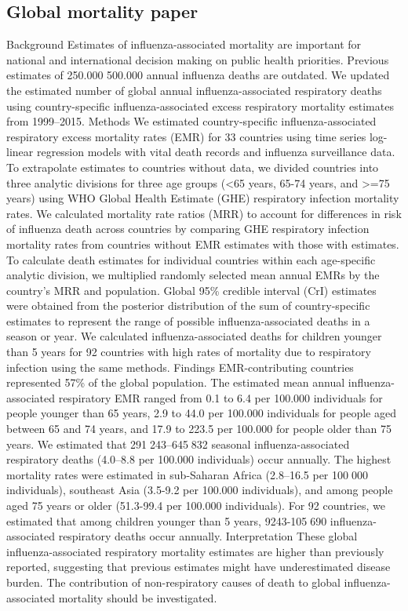 \subsection{Global mortality paper}
\cite{iulianoEstimatesGlobalSeasonal2018}
Background
Estimates of influenza-associated mortality are important for national and
international decision making on public health priorities. Previous estimates
of 250.000 500.000 annual influenza deaths are outdated. We updated the
estimated number of global annual influenza-associated respiratory deaths using
country-specific influenza-associated excess respiratory mortality estimates
from 1999–2015.
Methods
We estimated country-specific influenza-associated respiratory excess mortality
rates (EMR) for 33 countries using time series log-linear regression models
with vital death records and influenza surveillance data. To extrapolate
estimates to countries without data, we divided countries into three analytic
divisions for three age groups (<65 years, 65-74 years, and >=75 years) using
WHO Global Health Estimate (GHE) respiratory infection mortality rates. We
calculated mortality rate ratios (MRR) to account for differences in risk of
influenza death across countries by comparing GHE respiratory infection
mortality rates from countries without EMR estimates with those with estimates.
To calculate death estimates for individual countries within each age-specific
analytic division, we multiplied randomly selected mean annual EMRs by the
country's MRR and population. Global 95\% credible interval (CrI) estimates were
obtained from the posterior distribution of the sum of country-specific
estimates to represent the range of possible influenza-associated deaths in a
season or year. We calculated influenza-associated deaths for children younger
than 5 years for 92 countries with high rates of mortality due to respiratory
infection using the same methods.
Findings
EMR-contributing countries represented 57\% of the global population. The
estimated mean annual influenza-associated respiratory EMR ranged from 0.1 to
6.4 per 100.000 individuals for people younger than 65 years, 2.9 to 44.0 per
100.000 individuals for people aged between 65 and 74 years, and 17.9 to 223.5
per 100.000 for people older than 75 years. We estimated that 291 243–645 832
seasonal influenza-associated respiratory deaths (4.0–8.8 per 100.000
individuals) occur annually. The highest mortality rates were estimated in
sub-Saharan Africa (2.8–16.5 per 100 000 individuals), southeast Asia (3.5-9.2
per 100.000 individuals), and among people aged 75 years or older (51.3-99.4
per 100.000 individuals). For 92 countries, we estimated that among children
younger than 5 years, 9243-105 690 influenza-associated respiratory deaths
occur annually.
Interpretation
These global influenza-associated respiratory mortality estimates are higher
than previously reported, suggesting that previous estimates might have
underestimated disease burden. The contribution of non-respiratory causes of
death to global influenza-associated mortality should be investigated.


